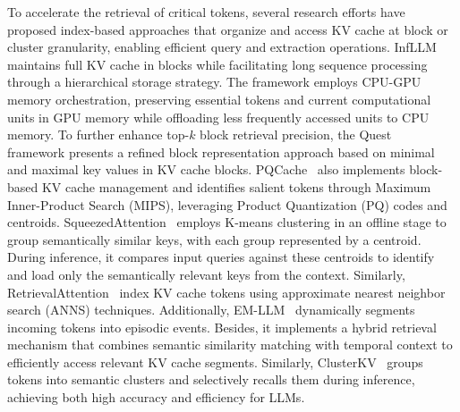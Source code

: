 To accelerate the retrieval of critical tokens, several research efforts have proposed 
index-based approaches that organize and access KV cache at block or cluster granularity, 
enabling efficient query and extraction operations.
InfLLM~\cite{xiao2024infllmtrainingfreelongcontextextrapolation} maintains full KV cache in blocks while facilitating long sequence 
processing through a hierarchical storage strategy. The framework employs CPU-GPU memory 
orchestration, preserving essential tokens and current computational units in GPU memory 
while offloading less frequently accessed units to CPU memory.
To further enhance top-$k$ block retrieval precision, the Quest~\cite{DBLP:conf/icml/TangZZXKH24} framework presents a refined block representation approach 
based on minimal and maximal key values in KV cache blocks. 
PQCache~\cite{zhang2024pqcache} also implements block-based KV cache management and 
identifies salient tokens through Maximum Inner-Product Search (MIPS), leveraging Product 
Quantization (PQ) codes and centroids.
SqueezedAttention~\cite{hooper2024squeezedattentionacceleratinglong} employs K-means clustering in an offline stage to group 
semantically similar keys, with each group represented by a centroid. During inference, it compares input queries against these 
centroids to identify and load only the semantically relevant keys from the context.
Similarly, RetrievalAttention~\cite{DBLP:journals/corr/abs-2409-10516} index KV cache tokens using approximate
nearest neighbor search (ANNS) techniques.
Additionally, EM-LLM~\cite{DBLP:journals/corr/abs-2407-09450} dynamically segments incoming 
tokens into episodic events. Besides, it implements 
a hybrid retrieval mechanism that combines semantic similarity matching with temporal 
context to efficiently access relevant KV cache segments.
Similarly,
ClusterKV~\cite{liu2024clusterkv} groups tokens into semantic clusters and selectively recalls them during inference, achieving both high accuracy and efficiency for LLMs.





